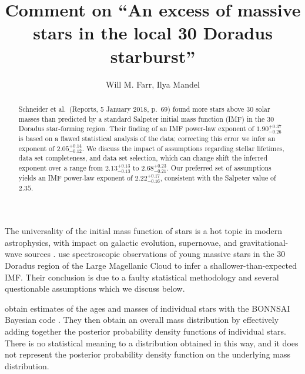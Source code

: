 \documentclass[apjl]{emulateapj}
\newcommand{\onesigrange}[3]{\ensuremath{#1^{+#2}_{-#3}}}
\newcommand{\alpharangeone}{\onesigrange{2.05}{0.14}{0.12}}
\newcommand{\alpharangetwo}{\onesigrange{2.13}{0.13}{0.13}}
\newcommand{\alpharangethree}{\onesigrange{2.22}{0.17}{0.16}}
\newcommand{\alpharangefour}{\onesigrange{2.68}{0.23}{0.21}}
\begin{document}
\title{Comment on ``An excess of massive stars in the local 30 Doradus starburst''}

\author{Will M. Farr, Ilya Mandel}

\begin{abstract}
Schneider et al.~(Reports, 5 January 2018, p.~69) found more stars above 30 solar masses than predicted by a standard Salpeter initial mass function (IMF) in the 30 Doradus star-forming region.  Their finding of an IMF power-law exponent of $1.90^{+0.37}_{-0.26}$ is based on a flawed statistical analysis of the data; correcting this error we infer an exponent of $\alpharangeone$.  We discuss the impact of assumptions regarding stellar lifetimes, data set completeness, and data set selection, which can change shift the inferred exponent over a range from $\alpharangetwo$ to $\alpharangefour$.  Our 
preferred set of assumptions yields an IMF power-law exponent of  $\alpharangethree$, consistent with the Salpeter value of $2.35$.  %
\end{abstract}

\maketitle

The universality of the initial mass function of stars is a hot topic in modern astrophysics, with impact on galactic evolution, supernovae, and gravitational-wave sources \citep{Kroupa:2002,Bastian:2010,deMinkBelczynski:2015}.    \citet{Schneider:2018} use spectroscopic observations of young massive stars in the 30 Doradus region of the Large Magellanic Cloud to infer a shallower-than-expected IMF.  Their conclusion is due to a faulty statistical methodology and several questionable assumptions which we discuss below.

\citet{Schneider:2018} obtain estimates of the ages and masses of individual stars with the BONNSAI Bayesian code \citep{Schneider:2017}.  They then obtain an overall mass distribution by effectively adding together the posterior probability density functions of individual stars.  There is no statistical meaning to a distribution obtained in this way, and it does not represent the posterior probability density function on the underlying mass distribution.  %
\end{document}
